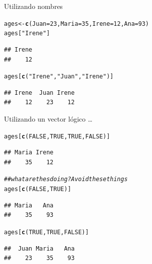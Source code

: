 \documentclass{config/apuntes}\usepackage[]{graphicx}\usepackage[]{xcolor}
\makeatletter
\newcommand{\hlnum}[1]{\textcolor[rgb]{0.686,0.059,0.569}{#1}}%
\newcommand{\hlsng}[1]{\textcolor[rgb]{0.192,0.494,0.8}{#1}}%
\newcommand{\hlcom}[1]{\textcolor[rgb]{0.678,0.584,0.686}{\textit{#1}}}%
\newcommand{\hldef}[1]{\textcolor[rgb]{0.345,0.345,0.345}{#1}}%
\newcommand{\hlkwb}[1]{\textcolor[rgb]{0.69,0.353,0.396}{#1}}%
\newcommand{\hlkwc}[1]{\textcolor[rgb]{0.333,0.667,0.333}{#1}}%
\newcommand{\hlkwd}[1]{\textcolor[rgb]{0.737,0.353,0.396}{\textbf{#1}}}%
\newenvironment{kframe}{%
 \def\at@end@of@kframe{}%
 \ifinner\ifhmode%
  \def\at@end@of@kframe{\end{minipage}}%
  \begin{minipage}{\columnwidth}%
 \fi\fi%
 \def\FrameCommand##1{\hskip\@totalleftmargin \hskip-\fboxsep
 \colorbox{shadecolor}{##1}\hskip-\fboxsep
     \hskip-\linewidth \hskip-\@totalleftmargin \hskip\columnwidth}%
 \MakeFramed {\advance\hsize-\width
   \@totalleftmargin\z@ \linewidth\hsize
   \@setminipage}}%
 {\par\unskip\endMakeFramed%
 \at@end@of@kframe}
\newenvironment{knitrout}{}{} %
\makeatother
\begin{document}
Utilizando nombres
\begin{knitrout}
\color{fgcolor}\begin{kframe}
\begin{alltt}
\hldef{ages} \hlkwb{<-} \hlkwd{c}\hldef{(}\hlkwc{Juan} \hldef{=} \hlnum{23}\hldef{,} \hlkwc{Maria} \hldef{=} \hlnum{35}\hldef{,} \hlkwc{Irene} \hldef{=} \hlnum{12}\hldef{,} \hlkwc{Ana} \hldef{=} \hlnum{93}\hldef{)}
\hldef{ages[}\hlsng{"Irene"}\hldef{]}
\end{alltt}
\begin{verbatim}
## Irene 
##    12
\end{verbatim}
\begin{alltt}
\hldef{ages[}\hlkwd{c}\hldef{(}\hlsng{"Irene"}\hldef{,} \hlsng{"Juan"}\hldef{,} \hlsng{"Irene"}\hldef{)]}
\end{alltt}
\begin{verbatim}
## Irene  Juan Irene 
##    12    23    12
\end{verbatim}
\end{kframe}
\end{knitrout}


Utilizando un vector lógico \ldots
\begin{knitrout}
\color{fgcolor}\begin{kframe}
\begin{alltt}
\hldef{ages[}\hlkwd{c}\hldef{(}\hlnum{FALSE}\hldef{,} \hlnum{TRUE}\hldef{,} \hlnum{TRUE}\hldef{,} \hlnum{FALSE}\hldef{)]}
\end{alltt}
\begin{verbatim}
## Maria Irene 
##    35    12
\end{verbatim}
\begin{alltt}
\hlcom{## what are thes doing? Avoid these things}
\hldef{ages[}\hlkwd{c}\hldef{(}\hlnum{FALSE}\hldef{,} \hlnum{TRUE}\hldef{)]}
\end{alltt}
\begin{verbatim}
## Maria   Ana 
##    35    93
\end{verbatim}
\begin{alltt}
\hldef{ages[}\hlkwd{c}\hldef{(}\hlnum{TRUE}\hldef{,} \hlnum{TRUE}\hldef{,} \hlnum{FALSE}\hldef{)]}
\end{alltt}
\begin{verbatim}
##  Juan Maria   Ana 
##    23    35    93
\end{verbatim}
\end{kframe}
\end{knitrout}
\end{document}
